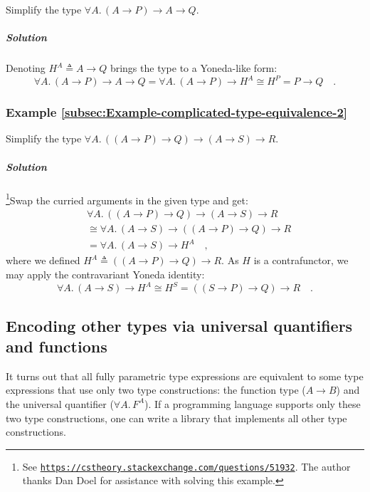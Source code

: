 Simplify the type $\forall A.\,(A\rightarrow P)\rightarrow A\rightarrow Q$.

\subparagraph{Solution}

Denoting $H^{A}\triangleq A\rightarrow Q$ brings the type to a Yoneda-like
form:
\[
\forall A.\,(A\rightarrow P)\rightarrow A\rightarrow Q=\forall A.\,(A\rightarrow P)\rightarrow H^{A}\cong H^{P}=P\rightarrow Q\quad.
\]
 

\subsubsection{Example \label{subsec:Example-complicated-type-equivalence-2}\ref{subsec:Example-complicated-type-equivalence-2}}

Simplify the type $\forall A.\,((A\rightarrow P)\rightarrow Q)\rightarrow(A\rightarrow S)\rightarrow R$.

\subparagraph{Solution}

\footnote{See \texttt{\href{https://cstheory.stackexchange.com/questions/51932}{https://cstheory.stackexchange.com/questions/51932}}.
The author thanks Dan Doel for assistance with solving
this example.}Swap the curried arguments in the given type and get:
\begin{align*}
 & \forall A.\,((A\rightarrow P)\rightarrow Q)\rightarrow(A\rightarrow S)\rightarrow R\\
 & \cong\forall A.\,(A\rightarrow S)\rightarrow((A\rightarrow P)\rightarrow Q)\rightarrow R\\
 & =\forall A.\,(A\rightarrow S)\rightarrow H^{A}\quad,
\end{align*}
where we defined $H^{A}\triangleq((A\rightarrow P)\rightarrow Q)\rightarrow R$.
As $H$ is a contrafunctor, we may apply the contravariant Yoneda
identity:
\[
\forall A.\,(A\rightarrow S)\rightarrow H^{A}\cong H^{S}=((S\rightarrow P)\rightarrow Q)\rightarrow R\quad.
\]


\subsection{Encoding other types via universal quantifiers and functions}

It turns out that all fully parametric type expressions are equivalent
to some type expressions that use only two type constructions: the
function type ($A\rightarrow B$) and the universal quantifier ($\forall A.\,F^{A}$).
If a programming language supports only these two type constructions,
one can write a library that implements all other type constructions.

